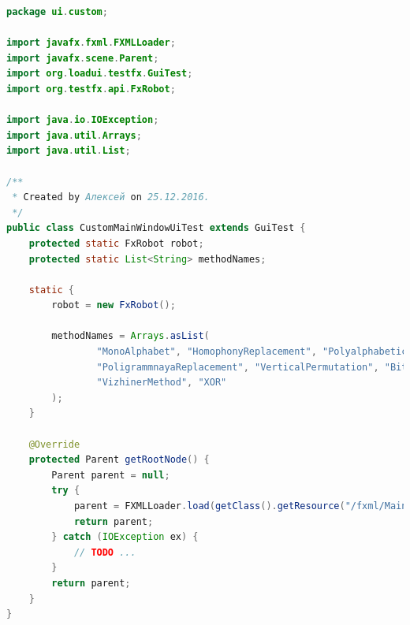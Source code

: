 \documentclass[a4paper,12pt]{article}
\begin{document}
\begin{lstlisting}[language=java, caption=код модуля CustomMainWindowUiTest.java]
package ui.custom;

import javafx.fxml.FXMLLoader;
import javafx.scene.Parent;
import org.loadui.testfx.GuiTest;
import org.testfx.api.FxRobot;

import java.io.IOException;
import java.util.Arrays;
import java.util.List;

/**
 * Created by Алексей on 25.12.2016.
 */
public class CustomMainWindowUiTest extends GuiTest {
    protected static FxRobot robot;
    protected static List<String> methodNames;

    static {
        robot = new FxRobot();

        methodNames = Arrays.asList(
                "MonoAlphabet", "HomophonyReplacement", "PolyalphabeticReplacement",
                "PoligrammnayaReplacement", "VerticalPermutation", "BitRevers",
                "VizhinerMethod", "XOR"
        );
    }

    @Override
    protected Parent getRootNode() {
        Parent parent = null;
        try {
            parent = FXMLLoader.load(getClass().getResource("/fxml/MainWindow.fxml"));
            return parent;
        } catch (IOException ex) {
            // TODO ...
        }
        return parent;
    }
}
\end{lstlisting}

\begin{lstlisting}[language=java, caption=код модуля TestingDataBaseService.java]

\end{lstlisting}
\end{document}
